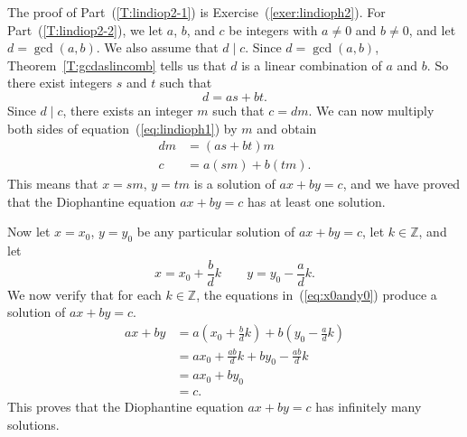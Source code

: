 \begin{myproof}
The proof of Part~(\ref{T:lindiop2-1}) is Exercise~(\ref{exer:lindioph2}).
For Part~(\ref{T:lindiop2-2}), we let $a$, $b$, and $c$ be integers with $a \ne 0$ and 
$b \ne 0$, and let $d = \gcd( a,b )$.  We also assume that  $d \mid c$.
Since $d = \gcd( a,b )$, Theorem~\ref{T:gcdaslincomb} tells us that $d$ is a linear combination of $a$ and $b$.  So there exist integers $s$ and $t$ such that
\begin{equation}
d = as + bt. \label{eq:lindioph1}
\end{equation}
Since $d \mid c$, there exists an integer $m$ such that $c = dm$.  We can now multiply both sides of equation~(\ref{eq:lindioph1}) by $m$ and obtain
\[
\begin{aligned}
dm &= ( {as + bt} ) m \\
 c &= a( sm ) + b( tm ).
\end{aligned}
\]
This means that $x = sm$, $y = tm$ is a solution of $ax + by = c$, and we have proved that the Diophantine equation $ax + by = c$ has at least one solution.

Now let $x = x_0$, $y = y_0$ be any particular solution of $ax + by = c$, let 
$k \in \mathbb{Z}$, and let
\begin{equation}
x = x_0 + \frac{b}{d} k  \qquad  y = y_0 - \frac{a}{d} k. 
\label{eq:x0andy0}%
\end{equation}
We now verify that for each $k \in \mathbb{Z}$, the equations in~(\ref{eq:x0andy0}) produce a solution of $ax + by = c$.
\[
\begin{aligned}
ax + by &= a \!\left( {x_0 + \frac{b}{d} k } \right) + b \!\left( {y_0 - \frac{a}{d} k} \right ) \\
        &= a x_0 + \frac{ab}{d} k + b y_0 - \frac{ab}{d} k \\
        &= a x_0 + b y_0 \\
        &= c.
\end{aligned}
\]
This proves that the Diophantine equation $ax + by = c$ has infinitely many solutions.


\end{myproof}
